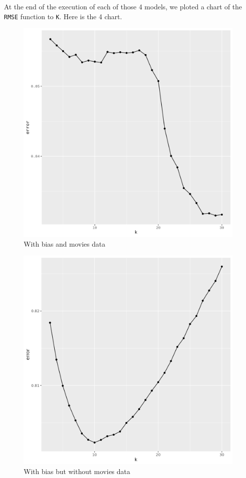 \documentclass[
]{article}
\begin{document}
At the end of the execution of each of those 4 models, we ploted a chart
of the \texttt{RMSE} function to \texttt{K}. Here is the 4 chart.

\begin{figure}
\centering
\includegraphics{./model-bias-movies.png}
\caption{With bias and movies data}
\end{figure}

\begin{figure}
\centering
\includegraphics{./model-bias-no-movies.png}
\caption{With bias but without movies data}
\end{figure}
\end{document}

